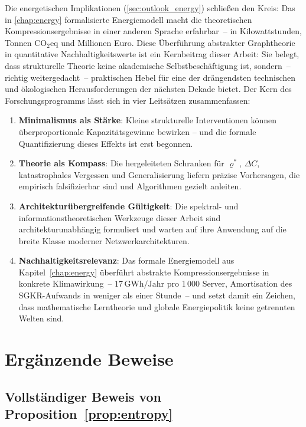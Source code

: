 \documentclass[12pt, a4paper, openany]{report}
\begin{document}
Die energetischen Implikationen (\cref{sec:outlook_energy}) schließen
den Kreis: Das in \cref{chap:energy} formalisierte Energiemodell macht
die theoretischen Kompressionsergebnisse in einer anderen Sprache erfahrbar~--
in Kilowattstunden, Tonnen CO$_2$eq und Millionen Euro.
Diese Überführung abstrakter Graphtheorie in quantitative
Nachhaltigkeitswerte ist ein Kernbeitrag dieser Arbeit: Sie belegt, dass
strukturelle Theorie keine akademische Selbstbeschäftigung ist, sondern~--
richtig weitergedacht~-- praktischen Hebel für eine der drängendsten
technischen und ökologischen Herausforderungen der nächsten Dekade bietet.
Der Kern des Forschungsprogramms lässt sich in vier Leitsätzen
zusammenfassen:
\begin{enumerate}[label=(\roman*)]
  \item \textbf{Minimalismus als Stärke}: Kleine strukturelle Interventionen
    können überproportionale Kapazitätsgewinne bewirken -- und die formale
    Quantifizierung dieses Effekts ist erst begonnen.
  \item \textbf{Theorie als Kompass}: Die hergeleiteten Schranken für
    $\varrho^*$, $\Delta C$, katastrophales Vergessen und Generalisierung
    liefern präzise Vorhersagen, die empirisch falsifizierbar sind und
    Algorithmen gezielt anleiten.
  \item \textbf{Architekturübergreifende Gültigkeit}: Die spektral-
    und informationstheoretischen Werkzeuge dieser Arbeit sind
    architekturunabhängig formuliert und warten auf ihre Anwendung auf
    die breite Klasse moderner Netzwerkarchitekturen.
  \item \textbf{Nachhaltigkeitsrelevanz}: Das formale Energiemodell aus
    Kapitel~\ref{chap:energy} überführt abstrakte Kompressionsergebnisse
    in konkrete Klimawirkung~-- $17\,\mathrm{GWh/Jahr}$ pro 1\,000 Server,
    Amortisation des SGKR-Aufwands in weniger als einer Stunde~-- und
    setzt damit ein Zeichen, dass mathematische Lerntheorie und globale
    Energiepolitik keine getrennten Welten sind.
\end{enumerate}

\appendix
\chapter{Ergänzende Beweise}
\label{app:proofs}

\section{Vollständiger Beweis von Proposition~\ref{prop:entropy}}
\end{document}
